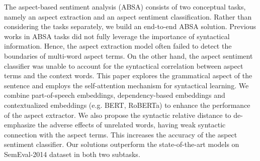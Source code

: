 The aspect-based sentiment analysis (ABSA) consists of two conceptual tasks, namely an aspect extraction and an aspect sentiment classification. Rather than considering the tasks separately, we build an end-to-end ABSA solution. Previous works in ABSA tasks did not fully leverage the importance of syntactical information. Hence, the aspect extraction model often failed to detect the boundaries of multi-word aspect terms. On the other hand, the aspect sentiment classifier was unable to account for the syntactical correlation between aspect terms and the context words. This paper explores the grammatical aspect of the sentence and employs the self-attention mechanism for syntactical learning. We combine part-of-speech embeddings, dependency-based embeddings and  contextualized embeddings (e.g. BERT, RoBERTa) to enhance the performance of the aspect extractor. We also propose the syntactic relative distance to de-emphasize the adverse effects of unrelated words, having weak syntactic connection with the aspect terms. This increases the accuracy of the aspect sentiment classifier. Our solutions outperform the state-of-the-art models on SemEval-2014 dataset in both two subtasks.
